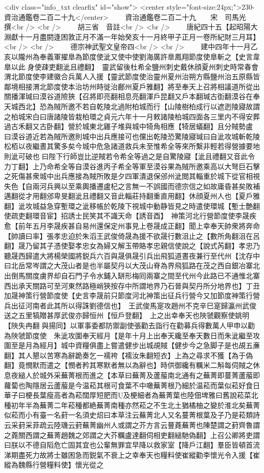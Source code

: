 <div class="info_txt clearfix" id="show">
<center style="font-size:24px;">230-資治通鑑卷二百二十九</center>
  　　資治通鑑卷二百二十九　　宋　司馬光　撰<br />
<br />
　　胡三省　音註<br />
<br />
　　唐紀四十五【起昭陽大淵獻十一月盡閼逢困敦正月不滿一年始癸亥十一月終甲子正月一卷所紀財三月耳】<br />
<br />
　　德宗神武聖文皇帝四<br />
<br />
　　建中四年十一月乙亥以隴州為奉義軍擢臯為節度使泚又使中使劉海廣許臯鳳翔節度使臯斬之【史言韋臯以此身使疎吏翻泚且禮翻】　靈武留後杜希全鹽州刺史戴休顔夏州刺史時常春會渭北節度使李建徽合兵萬人入援【靈武節度使治靈州夏州治朔方縣鹽州治五原縣皆鄰境相接渭北節度使本治坊州時徙治鄜州夏戶雅翻】將至奉天上召將相議道所從出關播渾瑊曰漠谷道險狹【召將即亮翻相息亮翻渾戶昆翻又戶本翻瑊古衘翻漠谷在奉天城西北】恐為賊所邀不若自乾陵北過附柏城而行【山陵樹柏成行以遮迾陵寢故謂之柏城宋白曰唐諸陵皆栽柏環之貞元六年十一月敕諸陵柏城四面各三里内不得安葬過古禾翻又古卧翻】營於城東北雞子堆與城中犄角相應【犄居蟻翻】且分賊勢盧曰漠谷道近若為賊所邀則城中出兵應接可也儻出乾陵恐驚陵寢瑊曰自泚攻城斬乾陵松栢以夜繼晝其驚多矣今城中危急諸道救兵未至惟希全等來所繫非輕若得營據要地則泚可破也曰陛下行師豈比逆賊若令希全等過之是自驚陵寢【泚且禮翻又音此令力丁翻】上乃命希全等自漠谷進丙子希全等軍至漠谷果為賊所邀乘高以大弩巨石擊之死傷甚衆城中出兵應接為賊所敗是夕四軍潰退保邠州泚閲其輜重於城下從官相視失色【自兩河兵興以至乘輿播遷盧杞之言無一不誤國而德宗信之如故庸昏甚矣敗補邁翻從才用翻邠卑旻翻泚且禮翻又音此輜莊持翻重直用翻】休顔夏州人也【夏戶雅翻】泚攻城益急穿塹環之泚移帳於乾陵下視城中動静皆見之時遣使環城【塹士艶翻使疏吏翻環音宦】招誘士民笑其不識天命【誘音酉】　神策河北行營節度使李晟疾愈【前年五月李晟疾甚自易州還保定州事見上卷晟成正翻】聞上幸奉天帥衆將奔命【帥讀曰率】張孝忠迫於朱滔王武俊倚晟為援不欲晟行數沮止之【數所角翻沮在呂翻】晟乃留其子憑使娶孝忠女為婦又解玉帶賂孝忠親信使說之【說式芮翻】孝忠乃聽晟西歸遣大將楊榮國將鋭兵六百與晟俱晟引兵出飛狐道晝夜兼行至代州【沈存中曰北岳常岑謂之大茂山者是也半屬契丹以大茂山脊為界飛狐路在茂之西自銀冶寨北出倒馬關度虜界却自石門子令水鋪入缾形梅囘兩寨之間至代州今此路已不通惟北寨西出承天關路可至河東然路極峭狹按存中所謂地界乃石晉與契丹所分地界也】丁丑加晟神策行營節度使【史言李晟前只節度河北神策出征兵行營今又加節度神策行營兵出征河南者此其所以得誅劉德信也】　王武俊馬寔攻趙州不克辛巳寔歸瀛州武俊送之五里犒贈甚厚武俊亦歸恒州【恒戶登翻】　上之出幸奉天也陜虢觀察使姚明【陜失冉翻與揚同】以軍事委都防禦副使張勸去詣行在勸募兵得數萬人甲申以勸為陜虢節度使　朱泚攻圍奉天經月【是年十月上出奉天纔至奉天數日而朱泚繼至攻圍至是月為經月】城中資糧俱盡上嘗遣健步出城覘賊【健步今之急脚子是也覘五亷翻】其人懇以苦寒為辭跪奏乞一襦袴【襦汝朱翻短衣】上為之尋求不獲【為于偽翻】竟憫默而遣之【憫者矜其寒默者無以為辭也】時供御纔有糲米二斛每伺賊之休息夜縋人於城外采蕪菁根而進之【本草曰蕪菁及蘆菔南北通有之蕪菁即蔓菁蘆菔即蘿蔔也陶隱居云蘆菔是今温菘其根可食葉不中噉蕪菁根乃細於温菘而葉似菘好食日華子曰梗長葉瘦高者為菘闊厚短肥而及梗細者為蕪菁葉也陸佃埤雅曰舊說菘菜北種初年半為蕪菁二年菘種都絶蕪菁南種亦然菘之不生北土猶橘柚之變於淮北矣蕪菁似菘而小有臺一名葑一名須史炤曰本草注云蕪菁北人又名蔓菁根葉及子乃是菘類詩云采葑采菲疏云陸璣云葑蕪菁幽州人或謂之芥方言云蘴蕘蕪菁也陳楚謂之葑齊魯謂之蕘關西謂之蕪菁趙魏之郊謂之大芥糲盧達翻伺相吏翻縋馳偽翻】上召公卿將吏謂曰朕以不德自䧟危亡固其宜也公輩無罪宜早降以救家室【降戶江翻】羣臣皆頓首流涕期盡死力故將士雖困急而鋭氣不衰上之幸奉天也糧料使崔縱勸李懷光令入援【崔縱為魏縣行營糧料使】懷光從之